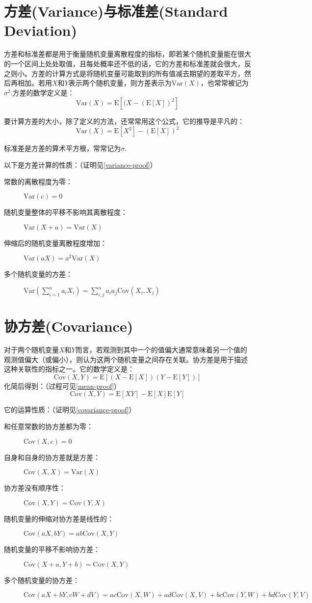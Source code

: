 \documentclass[UTF8]{ctexbook}
\begin{document}
\section{方差(Variance)与标准差(Standard Deviation)}
\label{var-sd}
方差和标准差都是用于衡量随机变量离散程度的指标，即若某个随机变量能在很大的一个区间上处处取值，且每处概率还不低的话，它的方差和标准差就会很大，反之则小。方差的计算方式是将随机变量可能取到的所有值减去期望的差取平方，然后再相加。若用$X$和$Y$表示两个随机变量，则方差表示为$\mathrm{Var}(X)$，也常常被记为$\sigma^2$.方差的数学定义是：
\[
	\mathrm{Var}(X)=\mathrm E[(X-(\mathrm E[X])^2]
\]

要计算方差的大小，除了定义的方法，还常常用这个公式，它的推导是平凡的：
\[
    \mathrm{Var}(X)=\mathrm E[X^2]-\left(\mathrm{E}[X]\right)^2
\]

标准差是方差的算术平方根，常常记为$\sigma$.

以下是方差计算的性质：（证明见\ref{variance-proof}）
\begin{description}
	\item [常数的离散程度为零：]
	$\mathrm{Var}(c)=0$
	\item [随机变量整体的平移不影响其离散程度：]
	$\mathrm{Var}(X+a)=\mathrm{Var}(X)$
	\item [伸缩后的随机变量离散程度增加：]
	$\mathrm{Var}(aX)=a^2\mathrm{Var}(X)$
	\item [多个随机变量的方差：]
	$\mathrm{Var}\left(\sum_{i=1}^na_iX_i\right)=\sum_{i,j}^na_ia_j\mathrm{Cov}(X_i,X_j)$
\end{description}
\section{协方差(Covariance)}
\label{covariance}
对于两个随机变量$X$和$Y$而言，若观测到其中一个的值偏大通常意味着另一个值的观测值偏大（或偏小），则认为这两个随机变量之间存在关联。协方差是用于描述这种关联性的指标之一。它的数学定义是：
\[
	\mathrm{Cov}(X,Y)=\mathrm E[(X-\mathrm E[X])(Y-\mathrm E[Y])]
\]
化简后得到：（过程可见\ref{mean-proof}）
\[
	\mathrm{Cov}(X,Y)=\mathrm E[XY]-\mathrm E[X]\mathrm E[Y]
\]

它的运算性质：（证明见\ref{covariance-proof}）
\begin{description}
	\item [和任意常数的协方差都为零：]
	$\mathrm{Cov}(X, c)=0$
	\item [自身和自身的协方差就是方差：]
	$\mathrm{Cov}(X, X)=\mathrm{Var}(X)$
	\item [协方差没有顺序性：]
	$\mathrm{Cov}(X, Y)=\mathrm{Cov}(Y, X)$
	\item [随机变量的伸缩对协方差是线性的：]
	$\mathrm{Cov}(aX, bY)=ab\mathrm{Cov}(X, Y)$
	\item [随机变量的平移不影响协方差：]
	$\mathrm{Cov}(X+a, Y+b)=\mathrm{Cov}(X, Y)$
	\item [多个随机变量的协方差：]
	$\mathrm{Cov}(aX+bY, cW+dV)=ac\mathrm{Cov}(X, W)+ad\mathrm{Cov}(X, V)+bc\mathrm{Cov}(Y, W)+bd\mathrm{Cov}(Y, V)$
\end{description}
\end{document}
